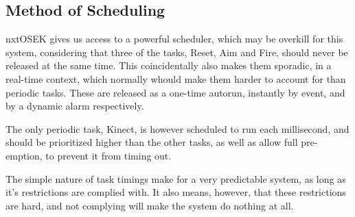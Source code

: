 \subsection{Method of Scheduling}
nxtOSEK gives us access to a powerful scheduler, which may be overkill for this system,
considering that three of the tasks, Reset, Aim and Fire, should never be released at
the same time. This coincidentally also makes them sporadic, in a real-time context,
which normally whould make them harder to account for than periodic tasks. These
are released as a one-time autorun, instantly by event, and by a dynamic alarm
respectively.

The only periodic task, Kinect, is however scheduled to run each millisecond, and
should be prioritized higher than the other tasks, as well as allow full pre-emption,
to prevent it from timing out.

The simple nature of task timings make for a very predictable system, as long as it's
restrictions are complied with. It also means, however, that these restrictions are
hard, and not complying will make the system do nothing at all.